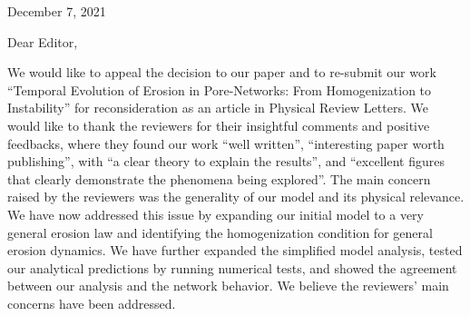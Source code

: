 \documentclass[11pt]{harvardletter}
\date{} %
\begin{document}
\vspace{-14mm}
\begin{letter}{}
\vspace{-21mm}
\hfill{December 7, 2021}
\vspace{7mm}



\vspace{-7mm}


\opening{Dear Editor,}


We would like to appeal the decision to our paper and to re-submit our work ``Temporal Evolution of Erosion in Pore-Networks: From Homogenization to Instability'' for reconsideration as an article in Physical Review Letters. We would like to thank the reviewers for their insightful comments and positive feedbacks, where they found our work ``well written'', ``interesting paper worth publishing'', with ``a clear theory to explain the results'', and ``excellent figures that clearly demonstrate the phenomena being explored''. The main concern raised by the reviewers was the generality of our model and its physical relevance. We have now addressed this issue by expanding our initial model to a very general erosion law and identifying the homogenization condition for general erosion dynamics. We have further expanded the simplified model analysis, tested our analytical predictions by running numerical tests, and showed the agreement between our analysis and the network behavior. We believe the reviewers' main concerns have been addressed. 


\end{letter}
\end{document}
